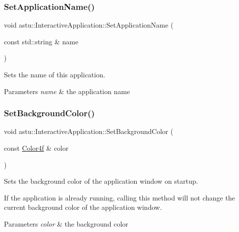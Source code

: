 \subsubsection{\texorpdfstring{Set\+Application\+Name()}{SetApplicationName()}}
{\footnotesize\ttfamily void astu\+::\+Interactive\+Application\+::\+Set\+Application\+Name (\begin{DoxyParamCaption}\item[{const std\+::string \&}]{name }\end{DoxyParamCaption})}

Sets the name of this application.


\begin{DoxyParams}{Parameters}
{\em name} & the application name \\
\hline
\end{DoxyParams}
\mbox{\label{classastu_1_1InteractiveApplication_ad5851eac16a92c2fba90ea369ee9ec2e}} 
\subsubsection{\texorpdfstring{Set\+Background\+Color()}{SetBackgroundColor()}}
{\footnotesize\ttfamily void astu\+::\+Interactive\+Application\+::\+Set\+Background\+Color (\begin{DoxyParamCaption}\item[{const \hyperlink{classastu_1_1Color}{Color4f} \&}]{color }\end{DoxyParamCaption})}

Sets the background color of the application window on startup.

If the application is already running, calling this method will not change the current background color of the application window.


\begin{DoxyParams}{Parameters}
{\em color} & the background color \\
\hline
\end{DoxyParams}
\mbox{\label{classastu_1_1InteractiveApplication_a0d4bf3ae685c87a9205f6d02d3ab167d}} 
